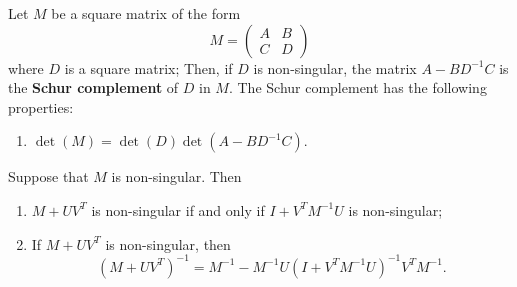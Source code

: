 \begin{definition}
    \label{def:schur}
    Let \(M\) be a square matrix of the form
    \[
        M =
        \begin{pmatrix}
            A & B \\
            C & D
        \end{pmatrix}
    \]
    where \(D\) is a square matrix; Then, if \(D\) is non-singular, the matrix \(A - B D^{-1} C\) is the \textbf{Schur complement} of \(D\) in \(M\).
    The Schur complement has the following properties:
    \begin{enumerate}
      \item \(\det(M) = \det(D)\det(A - BD^{-1}C)\).
    \end{enumerate}
\end{definition}

\begin{theorem}
\label{thm:smw-formula}
  Suppose that \(M\) is non-singular. 
  Then
  \begin{enumerate}[label = (\arabic*)]
      \item \(M + UV^T\) is non-singular if and only if \(I + V^TM^{-1}U\) is non-singular;
      \item If \(M + UV^T\) is non-singular, then
      \[
          (M + UV^T)^{-1} = M^{-1} - M^{-1}U(I + V^TM^{-1}U)^{-1}V^TM^{-1}.
      \]
  \end{enumerate}
\end{theorem}

